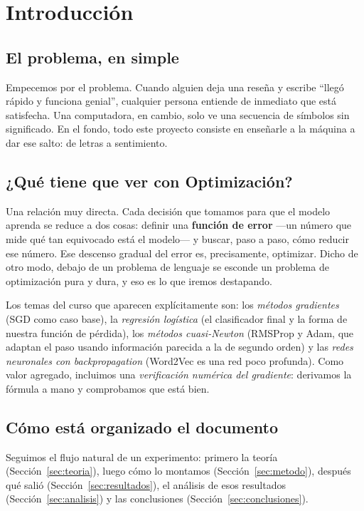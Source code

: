 \documentclass[11pt]{article}
\begin{document}
\tableofcontents
\newpage

\section{Introducción}

\subsection{El problema, en simple}
Empecemos por el problema. Cuando alguien deja una reseña y escribe ``llegó rápido y funciona
genial'', cualquier persona entiende de inmediato que está satisfecha. Una computadora, en
cambio, solo ve una secuencia de símbolos sin significado. En el fondo, todo este proyecto
consiste en enseñarle a la máquina a dar ese salto: de letras a sentimiento.

\subsection{¿Qué tiene que ver con Optimización?}
Una relación muy directa. Cada decisión que tomamos para que el modelo aprenda se reduce a
dos cosas: definir una \textbf{función de error} ---un número que mide qué tan equivocado
está el modelo--- y buscar, paso a paso, cómo reducir ese número. Ese descenso gradual del
error es, precisamente, optimizar. Dicho de otro modo, debajo de un problema de lenguaje se
esconde un problema de optimización pura y dura, y eso es lo que iremos destapando.

Los temas del curso que aparecen explícitamente son: los \emph{métodos gradientes} (SGD como
caso base), la \emph{regresión logística} (el clasificador final y la forma de nuestra
función de pérdida), los \emph{métodos cuasi-Newton} (RMSProp y Adam, que adaptan el paso
usando información parecida a la de segundo orden) y las \emph{redes neuronales con
backpropagation} (Word2Vec es una red poco profunda). Como valor agregado, incluimos una
\emph{verificación numérica del gradiente}: derivamos la fórmula a mano y comprobamos que
está bien.

\subsection{Cómo está organizado el documento}
Seguimos el flujo natural de un experimento: primero la teoría (Sección~\ref{sec:teoria}),
luego cómo lo montamos (Sección~\ref{sec:metodo}), después qué salió (Sección~\ref{sec:resultados}),
el análisis de esos resultados (Sección~\ref{sec:analisis}) y las conclusiones
(Sección~\ref{sec:conclusiones}).
\end{document}
